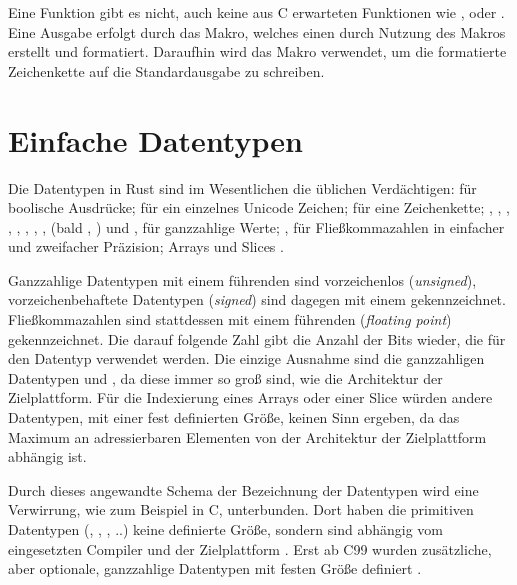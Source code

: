 Eine Funktion  gibt es nicht, auch keine aus C erwarteten Funktionen wie ,  oder .
Eine Ausgabe erfolgt durch das  Makro, welches einen  durch Nutzung des  Makros erstellt und formatiert.
Daraufhin wird das  Makro verwendet, um die formatierte Zeichenkette auf die Standardausgabe zu schreiben.

\section{Einfache Datentypen}
\label{rust:types:simple}

Die Datentypen in Rust sind im Wesentlichen die üblichen  Verdächtigen:  für boolische Ausdrücke;  für ein einzelnes Unicode Zeichen;  für eine Zeichenkette; , , , , , , , , (bald ,  \cite{rust:github:128bit_integer:rfc}) und ,   für ganzzahlige Werte; ,  für Fließkommazahlen in einfacher und zweifacher Präzision; Arrays und Slices \cite{rust:book:primitives}.

Ganzzahlige Datentypen mit einem führenden  sind vorzeichenlos (\textit{unsigned}), vorzeichenbehaftete Datentypen (\textit{signed}) sind dagegen mit einem  gekennzeichnet.
Fließkommazahlen sind stattdessen mit einem führenden  (\textit{floating point}) gekennzeichnet.
Die darauf folgende Zahl gibt die Anzahl der Bits wieder, die für den Datentyp verwendet werden.
Die einzige Ausnahme sind die ganzzahligen Datentypen  und , da diese immer so groß sind, wie die Architektur der Zielplattform.
Für die Indexierung eines Arrays oder einer Slice würden andere Datentypen, mit einer fest definierten Größe, keinen Sinn ergeben, da das Maximum an adressierbaren Elementen von der Architektur der Zielplattform abhängig ist.

Durch dieses angewandte Schema der Bezeichnung der Datentypen wird eine Verwirrung, wie zum Beispiel in C, unterbunden.
Dort haben die primitiven Datentypen (, , , ..) keine definierte Größe, sondern sind abhängig vom eingesetzten Compiler und der Zielplattform \cite[187]{deitel2013c}. Erst ab C99 wurden zusätzliche, aber optionale, ganzzahlige Datentypen mit festen Größe definiert \cite[141]{goll2014c}.

